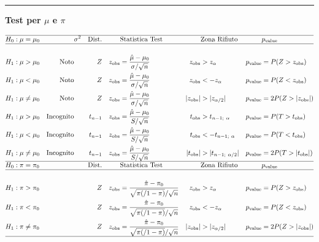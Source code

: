 \documentclass[
  11pt,
]{book}
\theoremstyle{mytheoremstyle}
\theoremstyle{mydefstyle}
\begin{document}
\begin{center}\rule{0.5\linewidth}{0.5pt}\end{center}

\textbf{Test per \(\mu\) e \(\pi\)}

\small

\begin{align*}
\hline
H_0:\mu&=\mu_0 &&\text{$\sigma^2$} &\text{Dist.}   & && \text{Statistica Test} &&   \text{Zona Rifiuto} &&p_\text{value}\\
\hline\\
H_1:\mu&>\mu_0 & \text{Noto} &&  Z && z_\text{obs}&=\frac{\hat \mu-\mu_0}{\sigma/\sqrt{n}} & z_\text{obs}&>z_\alpha & p_\text{value}&= P(Z>z_\text{obs})\\
H_1:\mu&<\mu_0 & \text{Noto} &&  Z && z_\text{obs}&=\frac{\hat \mu-\mu_0}{\sigma/\sqrt{n}} & z_\text{obs}&<-z_\alpha& p_\text{value}&= P(Z<z_\text{obs})\\
H_1:\mu&\ne\mu_0 & \text{Noto} &&  Z && z_\text{obs}&=\frac{\hat \mu-\mu_0}{\sigma/\sqrt{n}} & |z_\text{obs}|&>|z_{\alpha/2}| & p_\text{value}&= 2P(Z>|z_\text{obs}|)\\
H_1:\mu&>\mu_0 & \text{Incognito} &&  t_{n-1} && z_\text{obs}&=\frac{\hat \mu-\mu_0}{S/\sqrt{n}} & t_\text{obs}&>t_{n-1;~\alpha}& p_\text{value}&= P(T>t_\text{obs})\\
H_1:\mu&<\mu_0 & \text{Incognito} &&  t_{n-1} && z_\text{obs}&=\frac{\hat \mu-\mu_0}{S/\sqrt{n}} & t_\text{obs}&<-t_{n-1;~\alpha}& p_\text{value}&= P(T<t_\text{obs})\\
H_1:\mu&\ne\mu_0 & \text{Incognito} &&  t_{n-1} && z_\text{obs}&=\frac{\hat \mu-\mu_0}{S/\sqrt{n}} & |t_\text{obs}|&>|t_{n-1;~\alpha/2}|& p_\text{value}&= 2P(T>|t_\text{obs}|)\\
\hline
H_0:\pi&=\pi_0 && &\text{Dist.}   && &\text{Statistica Test} &&   \text{Zona Rifiuto} &&p_\text{value}\\
\hline\\
H_1:\pi&>\pi_0 &  &&  Z && z_\text{obs}&=\frac{\hat \pi-\pi_0}{\sqrt{\pi(/1-\pi)}/\sqrt{n}} & z_\text{obs}&>z_\alpha& p_\text{value}&= P(Z>z_\text{obs})\\
H_1:\pi&<\pi_0 &  &&  Z && z_\text{obs}&=\frac{\hat \pi-\pi_0}{\sqrt{\pi(/1-\pi)}/\sqrt{n}} & z_\text{obs}&<-z_\alpha& p_\text{value}&= P(Z<z_\text{obs})\\
H_1:\pi&\ne\pi_0 &  &&  Z && z_\text{obs}&=\frac{\hat \pi-\pi_0}{\sqrt{\pi(/1-\pi)}/\sqrt{n}} & |z_\text{obs}|&>|z_{\alpha/2}| & p_\text{value}&= 2P(Z>|z_\text{obs}|)\\
\hline
\end{align*}
\end{document}
